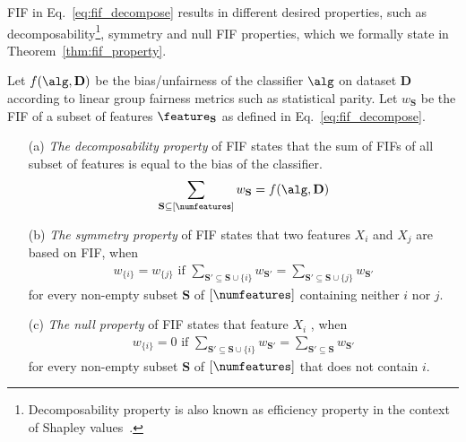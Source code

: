  

FIF in Eq.~\eqref{eq:fif_decompose} results in different desired properties, such as decomposability\footnote{ Decomposability property is also known as efficiency property in the context of Shapley values~\cite{roth1988shapley}.}, symmetry and null FIF properties, which we formally state in Theorem~\ref{thm:fif_property}.

\begin{theorem}
	\label{thm:fif_property}
	Let $ f(\alg, \mathbf{D}) $ be the bias/unfairness of the classifier $ \alg $ on dataset $ \mathbf{D} $ according to linear group fairness metrics such as statistical parity. Let $ w_{\mathbf{S}}  $ be the FIF of a subset of  features $ \feature_{\mathbf{S}} $ as defined in Eq.~\eqref{eq:fif_decompose}. 
	\begin{enumerate}
		\item[(a)] \textit{The decomposability property} of FIF states that the sum of FIFs of all subset of  features is equal to the bias of the classifier. 
		\begin{align}\label{eq:constraint_framework}
		\sum_{\mathbf{S} \subseteq [\numfeatures] } w_{\mathbf{S}} = f(\alg, \mathbf{D})
		\end{align}
		\item[(b)] \textit{The symmetry property} of FIF states that  two features $ X_i $ and $ X_j $ are  based on FIF, when
		\begin{align}
		w_{\{i\}} = w_{\{j\}} \text{ if } \sum_{\mathbf{S}' \subseteq \mathbf{S}\cup \{i\}} w_{\mathbf{S}'} = 		\sum_{\mathbf{S}' \subseteq \mathbf{S} \cup \{j\}} w_{\mathbf{S}'} 
		\end{align}
		for every non-empty subset $ \mathbf{S} $ of $ [\numfeatures] $ containing neither $ i $ nor $ j $. 
		\item[(c)] 	\textit{The null property} of FIF states that feature $ X_i $ , when
		\begin{align}
		w_{\{i\}} = 0 	\text{ if }	\sum_{\mathbf{S}' \subseteq \mathbf{S} \cup \{i\}} w_{\mathbf{S}'} = 		\sum_{\mathbf{S}' \subseteq \mathbf{S}} w_{\mathbf{S}'} 
		\end{align}
		for every non-empty subset $ \mathbf{S} $ of $ [\numfeatures] $ that does not contain $ i $.
		
	\end{enumerate}
\end{theorem}

